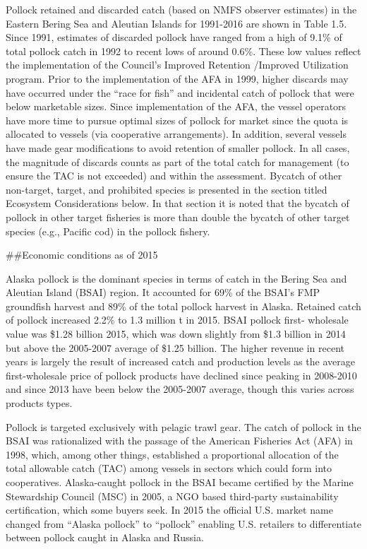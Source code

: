 Pollock retained and discarded catch (based on NMFS observer estimates)
in the Eastern Bering Sea and Aleutian Islands for 1991-2016 are shown
in Table 1.5. Since 1991, estimates of discarded pollock have ranged
from a high of 9.1\% of total pollock catch in 1992 to recent lows of
around 0.6\%. These low values reflect the implementation of the
Council's Improved Retention /Improved Utilization program. Prior to the
implementation of the AFA in 1999, higher discards may have occurred
under the ``race for fish'' and incidental catch of pollock that were
below marketable sizes. Since implementation of the AFA, the vessel
operators have more time to pursue optimal sizes of pollock for market
since the quota is allocated to vessels (via cooperative arrangements).
In addition, several vessels have made gear modifications to avoid
retention of smaller pollock. In all cases, the magnitude of discards
counts as part of the total catch for management (to ensure the TAC is
not exceeded) and within the assessment. Bycatch of other non-target,
target, and prohibited species is presented in the section titled
Ecosystem Considerations below. In that section it is noted that the
bycatch of pollock in other target fisheries is more than double the
bycatch of other target species (e.g., Pacific cod) in the pollock
fishery.

\#\#Economic conditions as of 2015

Alaska pollock is the dominant species in terms of catch in the Bering
Sea and Aleutian Island (BSAI) region. It accounted for 69\% of the
BSAI's FMP groundfish harvest and 89\% of the total pollock harvest in
Alaska. Retained catch of pollock increased 2.2\% to 1.3 million t in
2015. BSAI pollock first- wholesale value was \$1.28 billion 2015, which
was down slightly from \$1.3 billion in 2014 but above the 2005-2007
average of \$1.25 billion. The higher revenue in recent years is largely
the result of increased catch and production levels as the average
first-wholesale price of pollock products have declined since peaking in
2008-2010 and since 2013 have been below the 2005-2007 average, though
this varies across products types.

Pollock is targeted exclusively with pelagic trawl gear. The catch of
pollock in the BSAI was rationalized with the passage of the American
Fisheries Act (AFA) in 1998, which, among other things, established a
proportional allocation of the total allowable catch (TAC) among vessels
in sectors which could form into cooperatives. Alaska-caught pollock in
the BSAI became certified by the Marine Stewardship Council (MSC) in
2005, a NGO based third-party sustainability certification, which some
buyers seek. In 2015 the official U.S. market name changed from ``Alaska
pollock'' to ``pollock'' enabling U.S. retailers to differentiate
between pollock caught in Alaska and Russia.

